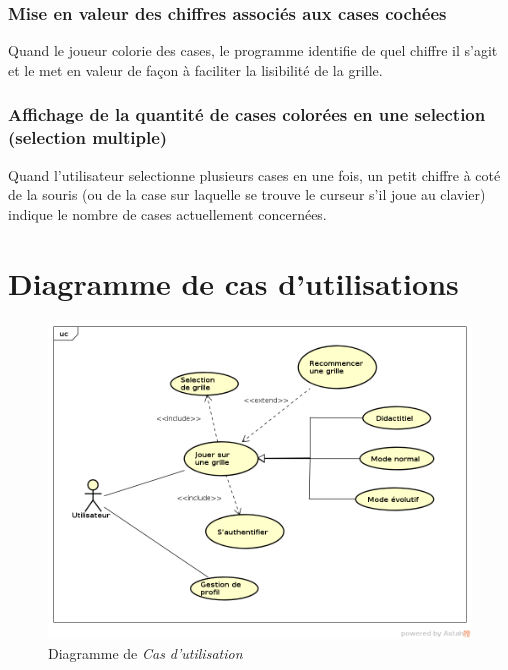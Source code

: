 \documentclass{report}
\begin{document}
		\subsubsection{Mise en valeur des chiffres associés aux cases cochées}
			Quand le joueur colorie des cases, le programme identifie de quel chiffre il s'agit et le met en valeur de façon à faciliter la lisibilité de la grille.
		\subsubsection{Affichage de la quantité de cases colorées en une selection (selection multiple)}
			Quand l'utilisateur selectionne plusieurs cases en une fois, un petit chiffre à coté de la souris (ou de la case sur laquelle se trouve le curseur s'il joue au clavier) indique le nombre de cases actuellement concernées.
		
   \section{Diagramme de cas d'utilisations}
      
    \begin{figure}[H]
	\caption{Diagramme de \textit{Cas d’utilisation}}
	\includegraphics[width=17cm]{../UML/UseCase_diagram/UseCase1.png}
    \end{figure}
    
\end{document}
